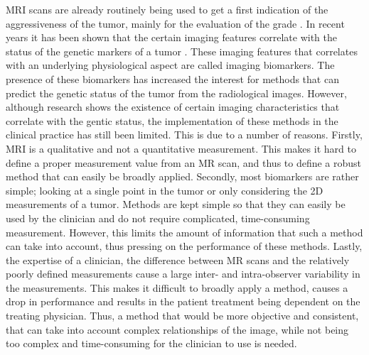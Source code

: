 \gls{MRI} scans are already routinely being used to get a first indication of the aggressiveness of the tumor, mainly for the evaluation of the grade \autocite{upadhyay2011MRIevaluation}.
In recent years it has been shown that the certain imaging features correlate with the status of the genetic markers of a tumor \autocite{patel2017mismatch, smits2016imaging}.
These imaging features that correlates with an underlying physiological aspect are called imaging biomarkers.
The presence of these biomarkers has increased the interest for methods that can predict the genetic status of the tumor from the radiological images.
However, although research shows the existence of certain imaging characteristics that correlate with the gentic status, the implementation of these methods in the clinical practice has still been limited.
This is due to a number of reasons.
Firstly, \gls{MRI} is a qualitative and not a quantitative measurement.
This makes it hard to define a proper measurement value from an \gls{MR} scan, and thus to define a robust method that can easily be broadly applied.
Secondly, most biomarkers are rather simple; looking at a single point in the tumor or only considering the 2D measurements of a tumor.
Methods are kept simple so that they can easily be used by the clinician and do not require complicated, time-consuming measurement.
However, this limits the amount of information that such a method can take into account, thus pressing on the performance of these methods.
Lastly, the expertise of a clinician, the difference between \gls{MR} scans and the relatively poorly defined measurements cause a large inter- and intra-observer variability in the measurements.
This makes it difficult to broadly apply a method, causes a drop in performance and results in the patient treatment being dependent on the treating physician.
Thus, a method that would be more objective and consistent, that can take into account complex relationships of the image, while not being too complex and time-consuming for the clinician to use is needed.

